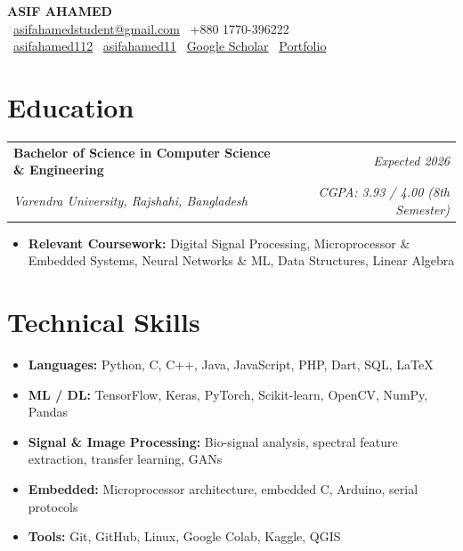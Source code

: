\documentclass[11pt,a4paper]{article}
\makeatletter
\newcommand{\resumeSubheading}[4]{
  \vspace{4pt}
  \noindent
  \begin{tabular*}{\textwidth}{@{}l@{\extracolsep{\fill}}r@{}}
    \textbf{#1} & \textit{#2} \\
    \textit{\small #3} & \textit{\small #4} \\
  \end{tabular*}
}
\makeatother
\begin{document}
\begin{center}
    {\LARGE\bfseries\color{primaryblue} ASIF AHAMED}\\[8pt]
    \small
    \faEnvelope\ \href{mailto:asifahamedstudent@gmail.com}{asifahamedstudent@gmail.com} \quad
    \faPhone\ +880 1770-396222 \\[4pt]
    \faLinkedin\ \href{https://www.linkedin.com/in/asifahamed112/}{asifahamed112} \quad
    \faGithub\ \href{https://github.com/asifahamed11}{asifahamed11} \quad
    \faGraduationCap\ \href{https://scholar.google.com/citations?user=ciEQlLEAAAAJ&hl=en}{Google Scholar} \quad
    \faGlobe\ \href{https://asifahamed11.github.io/asif-ahamed-portfolio/}{Portfolio}
\end{center}

\section*{Education}

\resumeSubheading
  {Bachelor of Science in Computer Science \& Engineering}{Expected 2026}
  {Varendra University, Rajshahi, Bangladesh}{CGPA: 3.93 / 4.00 (8th Semester)}

\vspace{2pt}
\begin{itemize}
    \item \textbf{Relevant Coursework:} Digital Signal Processing, Microprocessor \& Embedded Systems, Neural Networks \& ML, Data Structures, Linear Algebra
\end{itemize}

\section*{Technical Skills}

\begin{itemize}
    \item \textbf{Languages:} Python, C, C++, Java, JavaScript, PHP, Dart, SQL, LaTeX
    \item \textbf{ML / DL:} TensorFlow, Keras, PyTorch, Scikit-learn, OpenCV, NumPy, Pandas
    \item \textbf{Signal \& Image Processing:} Bio-signal analysis, spectral feature extraction, transfer learning, GANs
    \item \textbf{Embedded:} Microprocessor architecture, embedded C, Arduino, serial protocols
    \item \textbf{Tools:} Git, GitHub, Linux, Google Colab, Kaggle, QGIS
\end{itemize}
\end{document}
